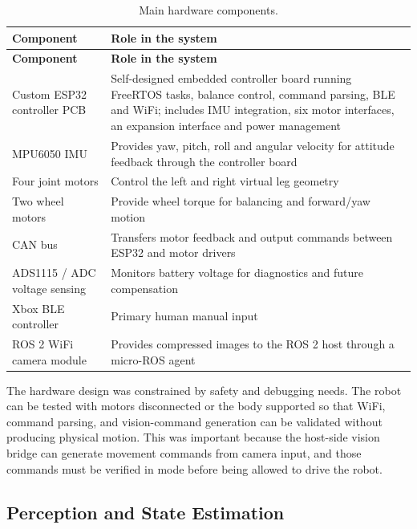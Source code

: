 \documentclass[12pt, a4paper]{article}
\begin{document}
\begingroup
\singlespacing
\small
\setlength{\tabcolsep}{2pt}
\renewcommand{\arraystretch}{1.15}
\begin{longtable}{>{\RaggedRight\arraybackslash}p{}>{\RaggedRight\arraybackslash}p{}}
\caption{Main hardware components.}\\
\toprule
\textbf{Component} & \textbf{Role in the system} \\
\midrule
\endfirsthead
\toprule
\textbf{Component} & \textbf{Role in the system} \\
\midrule
\endhead
Custom ESP32 controller PCB & Self-designed embedded controller board running FreeRTOS tasks, balance control, command parsing, BLE and WiFi; includes IMU integration, six motor interfaces, an expansion interface and power management \\
MPU6050 IMU & Provides yaw, pitch, roll and angular velocity for attitude feedback through the controller board \\
Four joint motors & Control the left and right virtual leg geometry \\
Two wheel motors & Provide wheel torque for balancing and forward/yaw motion \\
CAN bus & Transfers motor feedback and output commands between ESP32 and motor drivers \\
ADS1115 / ADC voltage sensing & Monitors battery voltage for diagnostics and future compensation \\
Xbox BLE controller & Primary human manual input \\
ROS 2 WiFi camera module & Provides compressed images to the ROS 2 host through a micro-ROS agent \\
\bottomrule
\end{longtable}
\endgroup

The hardware design was constrained by safety and debugging needs. The robot can be tested with motors disconnected or the body supported so that WiFi, command parsing, and vision-command generation can be validated without producing physical motion. This was important because the host-side vision bridge can generate movement commands from camera input, and those commands must be verified in \texttt{} mode before being allowed to drive the robot.

\subsection{Perception and State Estimation}
\end{document}
